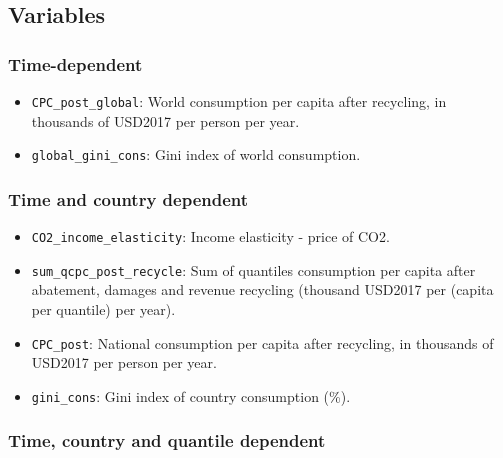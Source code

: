 \documentclass[
]{article}
\providecommand{\tightlist}{%
  \setlength{\itemsep}{0pt}\setlength{\parskip}{0pt}}
\begin{document}
\subsection{Variables}\label{variables-6}

\subsubsection{Time-dependent}\label{time-dependent-5}

\begin{itemize}
\tightlist
\item
  \texttt{CPC\_post\_global}: World consumption per capita after
  recycling, in thousands of USD2017 per person per year.
\item
  \texttt{global\_gini\_cons}: Gini index of world consumption.

\end{itemize}

\subsubsection{Time and country
dependent}\label{time-and-country-dependent-11}

\begin{itemize}
\tightlist
\item
  \texttt{CO2\_income\_elasticity}: Income elasticity - price of CO2.
\item
  \texttt{sum\_qcpc\_post\_recycle}: Sum of quantiles consumption per capita after abatement, damages and revenue recycling (thousand USD2017 per (capita per quantile) per year).
\item
  \texttt{CPC\_post}: National consumption per capita after recycling, in thousands of USD2017 per person per year.
\item
  \texttt{gini\_cons}: Gini index of country consumption (\%).
\end{itemize}

\subsubsection{Time, country and quantile
dependent}\label{time-country-and-quantile-dependent}
\end{document}
